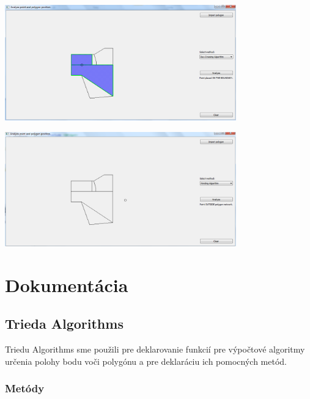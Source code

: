 \documentclass[12pt]{article}
\begin{document}
\begin{center}
   \includegraphics[width=10cm]{./img/na_hrane.png}
\end{center}

\begin{center}
   \includegraphics[width=10cm]{./img/mimo.png}
\end{center}

\section{Dokumentácia}
\subsection{Trieda Algorithms}
Triedu Algorithms sme použili pre deklarovanie funkcií pre výpočtové algoritmy určenia polohy bodu voči polygónu a pre deklaráciu ich pomocných metód.

\subsubsection{Metódy}
\end{document}
